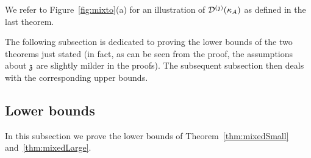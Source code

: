 
We refer to Figure~\ref{fig:mixto}(a) for an illustration of $\dt(\KA)$ as defined in the last theorem.

\medskip
The following subsection is dedicated to proving the lower bounds of the two theorems just stated (in fact, as can be seen from the proof, the assumptions about $\ss$ are slightly milder in the proofs). The subsequent subsection then deals with the corresponding upper bounds.


\subsection{Lower bounds}\label{sec:Lower}
%
In this subsection we prove the lower bounds of Theorem~\ref{thm:mixedSmall} and~\ref{thm:mixedLarge}.

